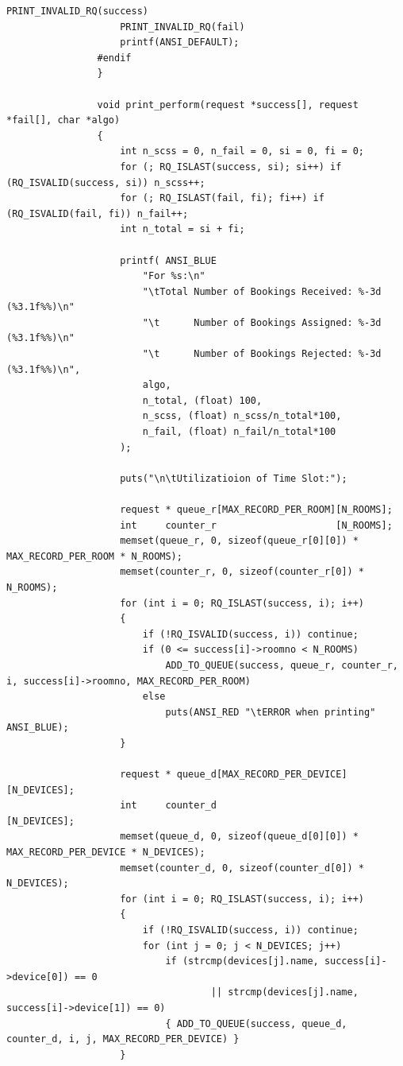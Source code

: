\documentclass{article}
\begin{document}
\begin{Verbatim}[gobble=8]
                    PRINT_INVALID_RQ(success)
                    PRINT_INVALID_RQ(fail)
                    printf(ANSI_DEFAULT);
                #endif
                }
                
                void print_perform(request *success[], request *fail[], char *algo)
                {
                    int n_scss = 0, n_fail = 0, si = 0, fi = 0;
                    for (; RQ_ISLAST(success, si); si++) if (RQ_ISVALID(success, si)) n_scss++;
                    for (; RQ_ISLAST(fail, fi); fi++) if (RQ_ISVALID(fail, fi)) n_fail++;
                    int n_total = si + fi;
                
                    printf( ANSI_BLUE
                        "For %s:\n"
                        "\tTotal Number of Bookings Received: %-3d (%3.1f%%)\n"
                        "\t      Number of Bookings Assigned: %-3d (%3.1f%%)\n"
                        "\t      Number of Bookings Rejected: %-3d (%3.1f%%)\n",
                        algo,
                        n_total, (float) 100,  
                        n_scss, (float) n_scss/n_total*100,  
                        n_fail, (float) n_fail/n_total*100
                    );
                
                    puts("\n\tUtilizatioion of Time Slot:");
                
                    request * queue_r[MAX_RECORD_PER_ROOM][N_ROOMS];
                    int     counter_r                     [N_ROOMS];
                    memset(queue_r, 0, sizeof(queue_r[0][0]) * MAX_RECORD_PER_ROOM * N_ROOMS);
                    memset(counter_r, 0, sizeof(counter_r[0]) * N_ROOMS);
                    for (int i = 0; RQ_ISLAST(success, i); i++)
                    {
                        if (!RQ_ISVALID(success, i)) continue;
                        if (0 <= success[i]->roomno < N_ROOMS)
                            ADD_TO_QUEUE(success, queue_r, counter_r, i, success[i]->roomno, MAX_RECORD_PER_ROOM)
                        else
                            puts(ANSI_RED "\tERROR when printing" ANSI_BLUE);
                    }
                
                    request * queue_d[MAX_RECORD_PER_DEVICE][N_DEVICES];
                    int     counter_d                       [N_DEVICES];
                    memset(queue_d, 0, sizeof(queue_d[0][0]) * MAX_RECORD_PER_DEVICE * N_DEVICES);
                    memset(counter_d, 0, sizeof(counter_d[0]) * N_DEVICES);
                    for (int i = 0; RQ_ISLAST(success, i); i++)
                    {
                        if (!RQ_ISVALID(success, i)) continue;
                        for (int j = 0; j < N_DEVICES; j++)
                            if (strcmp(devices[j].name, success[i]->device[0]) == 0
                                    || strcmp(devices[j].name, success[i]->device[1]) == 0)
                            { ADD_TO_QUEUE(success, queue_d, counter_d, i, j, MAX_RECORD_PER_DEVICE) }
                    }
                

\end{Verbatim}
\end{document}
